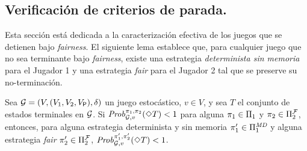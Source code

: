 
\subsection{Verificación de criterios de parada.}

Esta sección está dedicada a la
caracterización efectiva de los juegos que se detienen bajo \textit{fairness}.
El siguiente lema establece que, para cualquier juego que no sea terminante bajo
\textit{fairness}, existe una estrategia \emph{determinista sin memoria} para el Jugador 1 y una estrategia \textit{fair} para el Jugador 2 tal que se preserve su no-terminación.


\begin{lemma}\label{lm:memoryless-strat}
  Sea $\mathcal{G} = (V, (V_1, V_2, V_{\mathsf{P}}), \delta)$ un juego estocástico, $v \in V$, y sea $T$ el conjunto de estados terminales en $\mathcal{G}$.
  Si $\mathit{Prob}^{\pi_{1}, \pi_{2}}_{\mathcal{G}, v}(\Diamond T) < 1$
  para alguna
  $\pi_{1} \in \Pi_{1}$ y $\pi_{2} \in \Pi^{\mathcal{F}}_{2}$,
  entonces, para alguna estrategia determinista y sin memoria
  $\pi_{1}' \in \Pi^{\textit{MD}}_{1}$ y alguna estrategia \textit{fair}
  $\pi_{2}' \in \Pi^{\mathcal{F}}_{2}$,
  $\mathit{Prob}^{\pi_{1}', \pi_{2}'}_{\mathcal{G}, v}(\Diamond T) < 1$.
\end{lemma}

